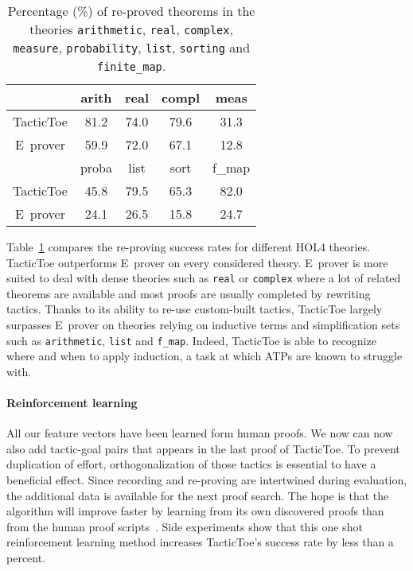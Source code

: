 \documentclass[runningheads,a4paper,draft]{svjour3}
\def\holfour{\textsf{HOL4}\xspace}
\def\eprover{\textsf{E~prover}\xspace}
\def\tactictoe{\textsf{TacticToe}\xspace}
\begin{document}
\begin{table}[]
\centering
\setlength{\tabcolsep}{3mm}
\begin{tabular}{@{}ccccc@{}}
\toprule
\phantom{ab} & {arith} & {real} & {compl} & {meas} \\
\midrule
\tactictoe & 81.2 & 74.0 & 79.6 & 31.3\\
\eprover & 59.9 & 72.0 & 67.1 & 12.8\\
\midrule
\phantom{abc} & {proba} & {list} & {sort} & {f\_map} \\
\midrule
\tactictoe & 45.8 & 79.5 & 65.3 & 82.0 \\
\eprover & 24.1 & 26.5 & 15.8 & 24.7 \\
\bottomrule
\end{tabular}
\caption{\label{theories} Percentage (\%) of re-proved theorems in the theories
\texttt{arithmetic}, \texttt{real}, \texttt{complex}, \texttt{measure},
\texttt{probability}, \texttt{list}, \texttt{sorting} and \texttt{finite\_map}.
}
\end{table}

Table~\ref{theories} compares the re-proving success rates for different
\holfour theories. \tactictoe outperforms \eprover on every
considered theory.
\eprover is more suited to deal with dense theories such as
\texttt{real} or \texttt{complex} where a lot of related theorems are available
and most proofs are usually completed by rewriting tactics. Thanks to its
ability to re-use custom-built tactics, \tactictoe
largely surpasses \eprover on theories relying on inductive terms and
simplification sets such as \texttt{arithmetic}, \texttt{list}
and \texttt{f\_map}. Indeed, \tactictoe is able to recognize where and when to
apply induction, a task at which ATPs are known to struggle with.

\paragraph{Reinforcement learning}
All our feature vectors have been learned form human proofs. We now can now
also add tactic-goal pairs that appears in the last proof of \tactictoe. To 
prevent
duplication of effort, orthogonalization of those
tactics is essential to have a beneficial effect.
Since recording and re-proving are intertwined during evaluation, the
additional data is available for the next proof search.
The hope is that the algorithm will improve faster by learning from its own
discovered proofs than from the human proof
scripts~\cite{DBLP:conf/cade/Urban07}. Side experiments show that
this one shot reinforcement learning method increases \tactictoe's success rate
by less than a percent.
\end{document}
